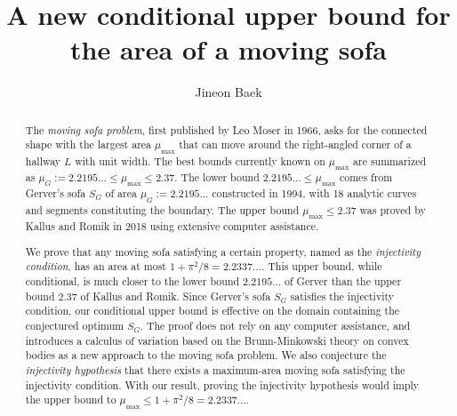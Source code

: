 \documentclass[10pt]{article}
\title{A new conditional upper bound for the area of a moving sofa}
\author{Jineon Baek}
\theoremstyle{plain}
\theoremstyle{definition}
\theoremstyle{remark}
\begin{document}
\maketitle

\begin{abstract}
The \emph{moving sofa problem}, first published by Leo Moser in 1966,
asks for the connected shape with the largest area $\mu_{\text{max}}$ that can move around the
right-angled corner of a hallway $L$ with unit width.
The best bounds currently known on $\mu_{\max}$ are summarized as
$\mu_G := 2.2195\ldots \leq \mu_{\max} \leq 2.37$.
The lower bound $2.2195\ldots \leq \mu_{\max}$ comes from Gerver's sofa $S_G$ of area $\mu_G :=
2.2195\ldots$ constructed in 1994, with 18 analytic curves and segments constituting the boundary.
The upper bound $\mu_{\max} \leq 2.37$ was proved by Kallus and Romik in 2018
using extensive computer assistance.

We prove that any moving sofa satisfying a certain property, named as the
\emph{injectivity condition},
has an area at most $1 + \pi^2/8 =
2.2337\ldots$. This upper bound, while conditional, is much closer to the lower bound $2.2195\ldots$
of Gerver than the upper bound $2.37$ of Kallus and Romik. Since Gerver's sofa $S_G$ satisfies the
injectivity condition, our conditional upper bound is effective on the domain containing the
conjectured optimum $S_G$. The proof does not rely on any computer assistance, and introduces a
calculus of variation based on the Brunn-Minkowski theory on convex bodies as a new approach to the
moving sofa problem. We also conjecture the \emph{injectivity hypothesis}
that there exists a maximum-area moving sofa satisfying the injectivity
condition. With our result, proving the injectivity hypothesis would imply the upper bound
to $\mu_{\max} \leq 1 + \pi^2/8 = 2.2337\ldots$.
\end{abstract}

\tableofcontents



\printbibliography
\end{document}
